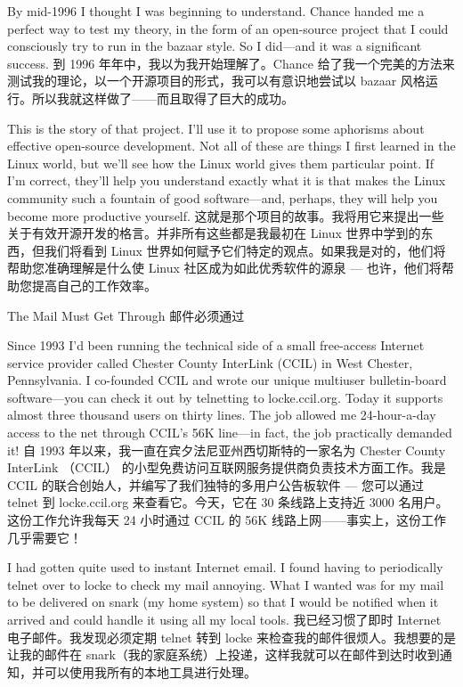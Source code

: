 \documentclass[a4paper,12pt,UTF8,twoside]{ctexbook}
\begin{document}
By mid-1996 I thought I was beginning to understand. Chance handed me a perfect way to test my theory, in the form of an open-source project that I could consciously try to run in the bazaar style. So I did—and it was a significant success.
到 1996 年年中，我以为我开始理解了。Chance 给了我一个完美的方法来测试我的理论，以一个开源项目的形式，我可以有意识地尝试以 bazaar 风格运行。所以我就这样做了——而且取得了巨大的成功。

This is the story of that project. I'll use it to propose some aphorisms about effective open-source development. Not all of these are things I first learned in the Linux world, but we'll see how the Linux world gives them particular point. If I'm correct, they'll help you understand exactly what it is that makes the Linux community such a fountain of good software—and, perhaps, they will help you become more productive yourself.
这就是那个项目的故事。我将用它来提出一些关于有效开源开发的格言。并非所有这些都是我最初在 Linux 世界中学到的东西，但我们将看到 Linux 世界如何赋予它们特定的观点。如果我是对的，他们将帮助您准确理解是什么使 Linux 社区成为如此优秀软件的源泉 — 也许，他们将帮助您提高自己的工作效率。

The Mail Must Get Through
邮件必须通过

Since 1993 I'd been running the technical side of a small free-access Internet service provider called Chester County InterLink (CCIL) in West Chester, Pennsylvania. I co-founded CCIL and wrote our unique multiuser bulletin-board software—you can check it out by telnetting to locke.ccil.org. Today it supports almost three thousand users on thirty lines. The job allowed me 24-hour-a-day access to the net through CCIL's 56K line—in fact, the job practically demanded it!
自 1993 年以来，我一直在宾夕法尼亚州西切斯特的一家名为 Chester County InterLink （CCIL） 的小型免费访问互联网服务提供商负责技术方面工作。我是 CCIL 的联合创始人，并编写了我们独特的多用户公告板软件 — 您可以通过 telnet 到 locke.ccil.org 来查看它。今天，它在 30 条线路上支持近 3000 名用户。这份工作允许我每天 24 小时通过 CCIL 的 56K 线路上网——事实上，这份工作几乎需要它！

I had gotten quite used to instant Internet email. I found having to periodically telnet over to locke to check my mail annoying. What I wanted was for my mail to be delivered on snark (my home system) so that I would be notified when it arrived and could handle it using all my local tools.
我已经习惯了即时 Internet 电子邮件。我发现必须定期 telnet 转到 locke 来检查我的邮件很烦人。我想要的是让我的邮件在 snark（我的家庭系统）上投递，这样我就可以在邮件到达时收到通知，并可以使用我所有的本地工具进行处理。
\end{document}
